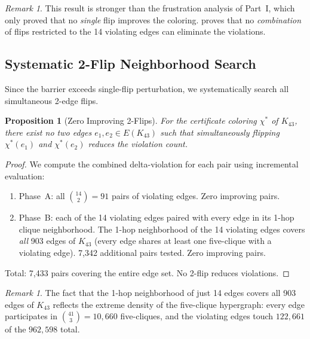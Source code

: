 \documentclass[11pt,a4paper]{article}
\theoremstyle{plain}
\newtheorem{proposition}[theorem]{Proposition}
\theoremstyle{remark}
\newtheorem{remark}[theorem]{Remark}
\begin{document}
\begin{remark}
This result is stronger than the frustration analysis of Part~I,
which only proved that no \emph{single} flip improves the coloring.
 proves that no \emph{combination} of flips
restricted to the 14 violating edges can eliminate the violations.
\end{remark}

\subsection{Systematic 2-Flip Neighborhood Search}
\label{sec:2flip}

Since the barrier exceeds single-flip perturbation, we systematically
search all simultaneous 2-edge flips.

\begin{proposition}[Zero Improving 2-Flips]\label{prop:2flip}
For the certificate coloring $\chi^*$ of $K_{43}$, there exist no
two edges $e_1, e_2 \in E(K_{43})$ such that simultaneously flipping
$\chi^*(e_1)$ and $\chi^*(e_2)$ reduces the violation count.
\end{proposition}

\begin{proof}
We compute the combined delta-violation for each pair using incremental
evaluation:
\begin{enumerate}[leftmargin=2em]
  \item Phase~A: all $\binom{14}{2} = 91$ pairs of violating edges.
    Zero improving pairs.
  \item Phase~B: each of the 14 violating edges paired with every
    edge in its 1-hop clique neighborhood. The 1-hop neighborhood
    of the 14 violating edges covers \emph{all} 903 edges of $K_{43}$
    (every edge shares at least one five-clique with a violating edge).
    7{,}342 additional pairs tested. Zero improving pairs.
\end{enumerate}
Total: 7{,}433 pairs covering the entire edge set. No 2-flip
reduces violations.
\end{proof}

\begin{remark}
The fact that the 1-hop neighborhood of just 14 edges covers all
903 edges of $K_{43}$ reflects the extreme density of the
five-clique hypergraph: every edge participates in
$\binom{41}{3} = 10{,}660$ five-cliques, and the violating edges
touch $122{,}661$ of the $962{,}598$ total.
\end{remark}
\end{document}
